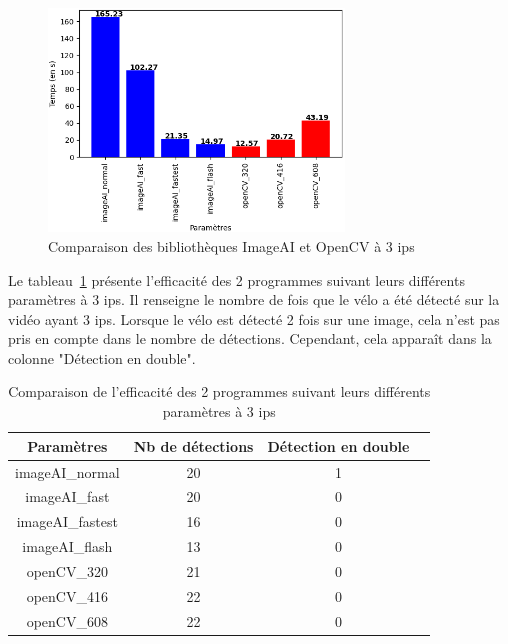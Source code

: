 \begin{figure}[H]
    \centering
    \includegraphics[width=0.7\textwidth]{img/result_3fps.png}
    \caption{Comparaison des bibliothèques ImageAI et OpenCV à 3 ips}
\end{figure}

Le tableau~\ref{tab_3fps} présente l'efficacité des 2 programmes suivant leurs différents paramètres à 3 ips.
Il renseigne le nombre de fois que le vélo a été détecté sur la vidéo ayant 3 ips.
Lorsque le vélo est détecté 2 fois sur une image, cela n'est pas pris en compte dans le nombre de détections.
Cependant, cela apparaît dans la colonne "Détection en double".

\begin{table}
    \centering
    \begin{tabular}{|c|c|c|c|}
        \hline
        \rowcolor{tableColorDark} Paramètres & Nb de détections & Détection en double \\
        \hline

        imageAI\_normal                      & 20               & 1                   \\\hline
        imageAI\_fast                        & 20               & 0                   \\\hline
        imageAI\_fastest                     & 16               & 0                   \\\hline
        imageAI\_flash                       & 13               & 0                   \\\hline
        openCV\_320                          & 21               & 0                   \\\hline
        openCV\_416                          & 22               & 0                   \\\hline
        openCV\_608                          & 22               & 0                   \\\hline
    \end{tabular}
    \caption{Comparaison de l'efficacité des 2 programmes suivant leurs différents paramètres à 3 ips}
    \label{tab_3fps}
\end{table}

